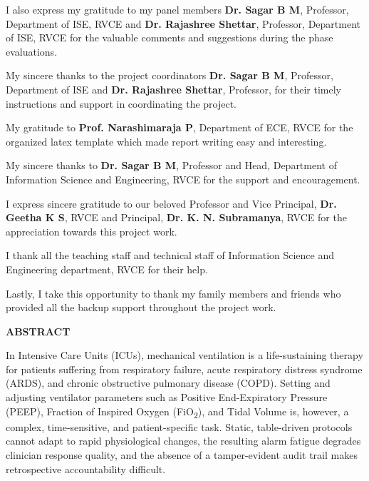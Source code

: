 \documentclass[12pt,a4paper,oneside]{report}
\begin{document}
\noindent I also express my gratitude to my panel members \textbf{Dr. Sagar B M}, Professor, Department of ISE, RVCE and \textbf{Dr. Rajashree Shettar}, Professor, Department of ISE, RVCE for the valuable comments and suggestions during the phase evaluations.
\vspace{0.15in}

\noindent My sincere thanks to the project coordinators \textbf{Dr. Sagar B M}, Professor, Department of ISE and \textbf{Dr. Rajashree Shettar}, Professor, for their timely instructions and support in coordinating the project.
\vspace{0.15in}

\noindent My gratitude to \textbf{Prof. Narashimaraja P}, Department of ECE, RVCE for the organized latex template which made report writing easy and interesting.
\vspace{0.15in}

\noindent My sincere thanks to \textbf{Dr. Sagar B M}, Professor and Head, Department of Information Science and Engineering, RVCE for the support and encouragement.
\vspace{0.15in}

\noindent I express sincere gratitude to our beloved Professor and Vice Principal, \textbf{Dr. Geetha K S}, RVCE and Principal, \textbf{Dr. K. N. Subramanya}, RVCE for the appreciation towards this project work.
\vspace{0.15in}

\noindent I thank all the teaching staff and technical staff of Information Science and Engineering department, RVCE for their help.
\vspace{0.15in}

\noindent Lastly, I take this opportunity to thank my family members and friends who provided all the backup support throughout the project work.
\newpage

\setcounter{page}{1}
\begin{center}\Huge\textbf{ABSTRACT}\end{center}
\vspace{0.2in}

In Intensive Care Units (ICUs), mechanical ventilation is a life-sustaining therapy for patients suffering from respiratory failure, acute respiratory distress syndrome (ARDS), and chronic obstructive pulmonary disease (COPD). Setting and adjusting ventilator parameters such as Positive End-Expiratory Pressure (PEEP), Fraction of Inspired Oxygen (FiO\textsubscript{2}), and Tidal Volume is, however, a complex, time-sensitive, and patient-specific task. Static, table-driven protocols cannot adapt to rapid physiological changes, the resulting alarm fatigue degrades clinician response quality, and the absence of a tamper-evident audit trail makes retrospective accountability difficult.
\end{document}
